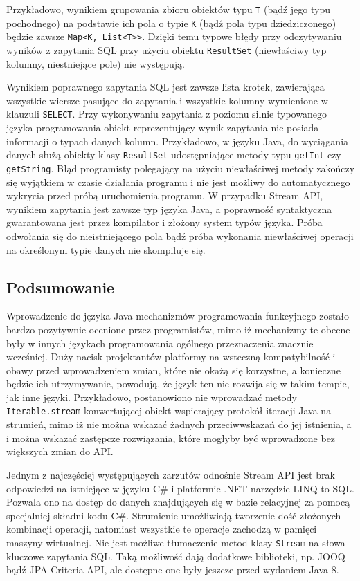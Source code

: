 \documentclass[12pt,twoside,openright]{extarticle}
\begin{document}
    Przykładowo, wynikiem grupowania zbioru obiektów typu \texttt{T} (bądź jego typu pochodnego) na podstawie ich pola o typie \texttt{K} (bądź pola typu dziedziczonego) będzie zawsze \texttt{Map<K, List<T>}\texttt{>}. Dzięki temu typowe błędy przy odczytywaniu wyników z zapytania SQL przy użyciu obiektu \texttt{ResultSet} (niewłaściwy typ kolumny, niestniejące pole) nie występują.

    Wynikiem poprawnego zapytania SQL jest zawsze lista krotek, zawierająca wszystkie wiersze pasujące do zapytania i wszystkie kolumny wymienione w klauzuli \texttt{SELECT}. Przy wykonywaniu zapytania z poziomu silnie typowanego języka programowania obiekt reprezentujący wynik zapytania nie posiada informacji o typach danych kolumn. Przykładowo, w języku Java, do wyciągania danych służą obiekty klasy \texttt{ResultSet} udostępniające metody typu \texttt{getInt} czy \texttt{getString}. Błąd programisty polegający na użyciu niewłaściwej metody zakończy się wyjątkiem w czasie działania programu i nie jest możliwy do automatycznego wykrycia przed próbą uruchomienia programu. W przypadku Stream API, wynikiem zapytania jest zawsze typ języka Java, a poprawność syntaktyczna gwarantowana jest przez kompilator i złożony system typów języka. Próba odwołania się do nieistniejącego pola bądź próba wykonania niewłaściwej operacji na określonym typie danych nie skompiluje się. 

\subsection{Podsumowanie}

    Wprowadzenie do języka Java mechanizmów programowania funkcyjnego zostało bardzo pozytywnie ocenione przez programistów, mimo iż mechanizmy te obecne były w innych językach programowania ogólnego przeznaczenia znacznie wcześniej. Duży nacisk projektantów platformy na wsteczną kompatybilność i obawy przed wprowadzeniem zmian, które nie okażą się korzystne, a konieczne będzie ich utrzymywanie, powodują, że język ten nie rozwija się w takim tempie, jak inne języki. Przykładowo, postanowiono nie wprowadzać metody \texttt{Iterable.stream} konwertującej obiekt wspierający protokół iteracji Java na strumień, mimo iż nie można wskazać żadnych przeciwwskazań do jej istnienia, a i można wskazać zastępcze rozwiązania, które mogłyby być wprowadzone bez większych zmian do API.

    Jednym z najczęściej występujących zarzutów odnośnie Stream API jest brak odpowiedzi na istniejące w języku C\# i platformie .NET narzędzie LINQ-to-SQL. Pozwala ono na dostęp do danych znajdujących się w bazie relacyjnej za pomocą specjalniej składni kodu C\#. Strumienie umożliwiają tworzenie dość złożonych kombinacji operacji, natomiast wszystkie te operacje zachodzą w pamięci maszyny wirtualnej. Nie jest możliwe tłumaczenie metod klasy \texttt{Stream} na słowa kluczowe zapytania SQL. Taką możliwość dają dodatkowe biblioteki, np. JOOQ bądź JPA Criteria API, ale dostępne one były jeszcze przed wydaniem Java 8. 
\end{document}
